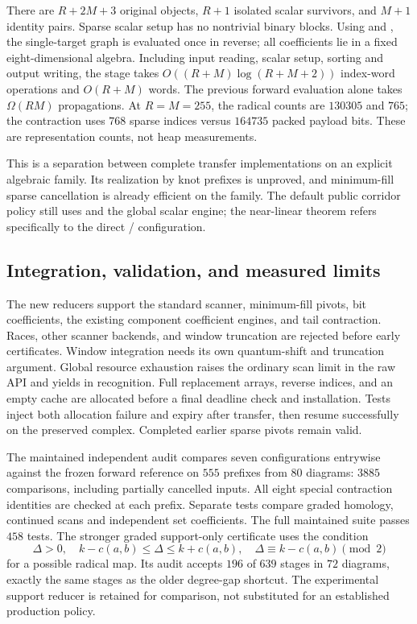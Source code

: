 There are $R+2M+3$ original objects, $R+1$ isolated scalar survivors, and
$M+1$ identity pairs.  Sparse scalar setup has no nontrivial binary blocks.
Using  and , the single-target graph is
evaluated once in reverse; all coefficients lie in a fixed eight-dimensional
algebra.  Including input reading, scalar setup, sorting and output writing,
the stage takes $O((R+M)\log(R+M+2))$ index-word operations and
$O(R+M)$ words.  The previous forward evaluation alone takes $\Omega(RM)$
propagations.  At $R=M=255$, the radical counts are $130305$ and $765$;
the contraction uses $768$ sparse indices versus $164735$ packed payload
bits.  These are representation counts, not heap measurements.

This is a separation between complete transfer implementations on an
explicit algebraic family.  Its realization by knot prefixes is unproved,
and minimum-fill sparse cancellation is already efficient on the family.
The default public corridor policy still uses  and the global
scalar engine; the near-linear theorem refers specifically to the direct
/ configuration.

\subsection{Integration, validation, and measured limits}

The new reducers support the standard scanner, minimum-fill pivots,
bit coefficients, the existing component coefficient engines, and tail
contraction.  Races, other scanner backends, and window truncation are
rejected before early certificates.  Window integration needs its own
quantum-shift and truncation argument.  Global resource exhaustion raises
the ordinary scan limit in the raw API and yields  in
recognition.  Full replacement arrays, reverse indices, and an empty cache
are allocated before a final deadline check and installation.  Tests inject
both allocation failure and expiry after transfer, then resume successfully
on the preserved complex.  Completed earlier sparse pivots remain valid.

The maintained independent audit compares seven configurations entrywise
against the frozen forward reference on $555$ prefixes from $80$ diagrams:
$3885$ comparisons, including partially cancelled inputs.  All eight special
contraction identities are checked at each prefix.  Separate tests compare
graded homology, continued scans and independent set coefficients.  The
full maintained suite passes $458$ tests.  The
stronger graded support-only certificate uses the condition
\[
 \Delta>0,\quad k-c(a,b)\le\Delta\le k+c(a,b),\quad
 \Delta\equiv k-c(a,b)\pmod2
\]
for a possible radical map.  Its audit accepts $196$ of $639$ stages in
$72$ diagrams, exactly the same stages as the older degree-gap shortcut.
The experimental support reducer is retained for comparison, not substituted
for an established production policy.

